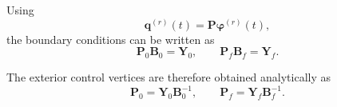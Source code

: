 Using
\begin{equation}
    \mathbf{q}^{(r)}(t)
    =
    \mathbf{P}\boldsymbol{\varphi}^{(r)}(t),
\end{equation}
the boundary conditions can be written as
\begin{equation}
    \mathbf{P}_0\mathbf{B}_0
    =
    \mathbf{Y}_0,
    \qquad
    \mathbf{P}_f\mathbf{B}_f
    =
    \mathbf{Y}_f.
\end{equation}

The exterior control vertices are therefore obtained analytically as
\begin{equation}
    \mathbf{P}_0
    =
    \mathbf{Y}_0\mathbf{B}_0^{-1},
    \qquad
    \mathbf{P}_f
    =
    \mathbf{Y}_f\mathbf{B}_f^{-1}.
    \label{eq:solveP_from_YB}
\end{equation}

